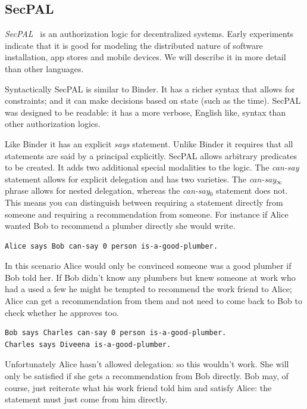 \documentclass[a4paper]{article}
\begin{document}
\subsection{SecPAL}

\emph{{SecPAL}}~\cite{Becker:2006vh} is an authorization logic for decentralized
systems. Early experiments indicate that it is good  for modeling the
distributed nature of software installation, app stores and mobile devices. We
will describe it in more detail than other languages.


Syntactically {SecPAL} is similar to Binder. It has a richer syntax
that allows for constraints; and it can make decisions based on state (such as the
time). {SecPAL} was designed to be readable: it has a more verbose, English like,
syntax than other authorization logics.

Like Binder it has an explicit \emph{says} statement. Unlike Binder it requires
that all statements are said by a principal explicitly. {SecPAL} allows
arbitrary predicates to be created. It adds two additional special modalities to
the logic. The \emph{can-say} statement allows for explicit delegation and has
two varieties.  The \emph{can-say$_\infty$} phrase allows for nested delegation,
whereas the \emph{can-say$_0$} statement does not.  This means you can
distinguish between requiring a statement directly from someone and requiring a
recommendation from someone.  For instance if Alice wanted Bob to recommend a
plumber directly she would write.

\begin{lstlisting}[language=SecPAL]
Alice says Bob can-say 0 person is-a-good-plumber.
\end{lstlisting}

In this scenario Alice would only be convinced someone was a good plumber if Bob
told her.  If Bob didn't know any plumbers but knew someone at work who had a
used a few he might be tempted to recommend the work friend to Alice; Alice can
get a recommendation from them and not need to come back to Bob to check whether
he approves too.

\begin{lstlisting}[language=SecPAL]
Bob says Charles can-say 0 person is-a-good-plumber.
Charles says Diveena is-a-good-plumber.
\end{lstlisting}

Unfortunately Alice hasn't allowed delegation: so this wouldn't work.  She will
only be satisfied if she gets a recommendation from Bob directly.  Bob may, of
course, just reiterate what his work friend told him and satisfy Alice: the
statement must just come from him directly.
\end{document}
